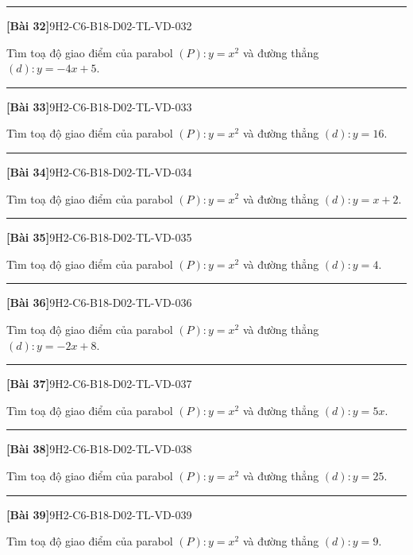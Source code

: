 \documentclass[12pt,a4paper]{article}
\newif\ifloigiai
\newenvironment{cauhoi}[2]{%
  \par\medskip\noindent\rule{\textwidth}{0.4pt}\par\nopagebreak
  \noindent\textbf{[#1]}\hfill{\scriptsize\ttfamily #2}\par\nopagebreak\smallskip}{\par}
\newcommand{\loigiai}[1]{\ifloigiai\par\smallskip\noindent\textit{Lời giải.} #1\par\fi}
\begin{document}
\begin{cauhoi}{Bài 32}{9H2-C6-B18-D02-TL-VD-032}
Tìm toạ độ giao điểm của parabol $(P): y=x^{2}$ và đường thẳng $(d): y=-4x+5$.
\loigiai{Phương trình hoành độ giao điểm: $x^{2}=-4x+5$ hay $x^{2}+4x-5=0$, có hai nghiệm $x=-5$ và $x=1$. Giao điểm là $(-5;25)$ và $(1;1)$.}
\end{cauhoi}
\begin{cauhoi}{Bài 33}{9H2-C6-B18-D02-TL-VD-033}
Tìm toạ độ giao điểm của parabol $(P): y=x^{2}$ và đường thẳng $(d): y=16$.
\loigiai{Phương trình hoành độ giao điểm: $x^{2}=0x+16$ hay $x^{2}+0x-16=0$, có hai nghiệm $x=-4$ và $x=4$. Giao điểm là $(-4;16)$ và $(4;16)$.}
\end{cauhoi}
\begin{cauhoi}{Bài 34}{9H2-C6-B18-D02-TL-VD-034}
Tìm toạ độ giao điểm của parabol $(P): y=x^{2}$ và đường thẳng $(d): y=x+2$.
\loigiai{Phương trình hoành độ giao điểm: $x^{2}=x+2$ hay $x^{2}-x-2=0$, có hai nghiệm $x=-1$ và $x=2$. Giao điểm là $(-1;1)$ và $(2;4)$.}
\end{cauhoi}
\begin{cauhoi}{Bài 35}{9H2-C6-B18-D02-TL-VD-035}
Tìm toạ độ giao điểm của parabol $(P): y=x^{2}$ và đường thẳng $(d): y=4$.
\loigiai{Phương trình hoành độ giao điểm: $x^{2}=0x+4$ hay $x^{2}+0x-4=0$, có hai nghiệm $x=-2$ và $x=2$. Giao điểm là $(-2;4)$ và $(2;4)$.}
\end{cauhoi}
\begin{cauhoi}{Bài 36}{9H2-C6-B18-D02-TL-VD-036}
Tìm toạ độ giao điểm của parabol $(P): y=x^{2}$ và đường thẳng $(d): y=-2x+8$.
\loigiai{Phương trình hoành độ giao điểm: $x^{2}=-2x+8$ hay $x^{2}+2x-8=0$, có hai nghiệm $x=-4$ và $x=2$. Giao điểm là $(-4;16)$ và $(2;4)$.}
\end{cauhoi}
\begin{cauhoi}{Bài 37}{9H2-C6-B18-D02-TL-VD-037}
Tìm toạ độ giao điểm của parabol $(P): y=x^{2}$ và đường thẳng $(d): y=5x$.
\loigiai{Phương trình hoành độ giao điểm: $x^{2}=5x$ hay $x^{2}-5x+0=0$, có hai nghiệm $x=0$ và $x=5$. Giao điểm là $(0;0)$ và $(5;25)$.}
\end{cauhoi}
\begin{cauhoi}{Bài 38}{9H2-C6-B18-D02-TL-VD-038}
Tìm toạ độ giao điểm của parabol $(P): y=x^{2}$ và đường thẳng $(d): y=25$.
\loigiai{Phương trình hoành độ giao điểm: $x^{2}=0x+25$ hay $x^{2}+0x-25=0$, có hai nghiệm $x=-5$ và $x=5$. Giao điểm là $(-5;25)$ và $(5;25)$.}
\end{cauhoi}
\begin{cauhoi}{Bài 39}{9H2-C6-B18-D02-TL-VD-039}
Tìm toạ độ giao điểm của parabol $(P): y=x^{2}$ và đường thẳng $(d): y=9$.
\loigiai{Phương trình hoành độ giao điểm: $x^{2}=0x+9$ hay $x^{2}+0x-9=0$, có hai nghiệm $x=-3$ và $x=3$. Giao điểm là $(-3;9)$ và $(3;9)$.}
\end{cauhoi}
\end{document}
